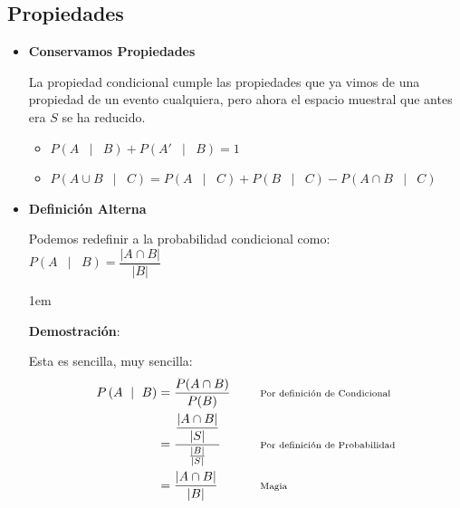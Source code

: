 \documentclass[12pt, fleqn]{report}                             %
\newenvironment{SmallIndentation}[1][0.75em]                    %
        {\begin{adjustwidth}{#1}{}\begin{footnotesize}}             %
        {\end{footnotesize}\end{adjustwidth}}                       %
\DeclareMathOperator \Space     {\quad}                         %
\DeclareMathOperator \MiniSpace {\;}                            %
\newcommand \Such           {\MiniSpace | \MiniSpace}           %
\newcommand \Remember[1]    {\Space\text{\scriptsize{#1}}}      %
\theoremstyle{break}                                            %
\newcommand{\Wrap}[1]           {\left( #1 \right)}             %
\newcommand{\Mag}[1]    {\left| #1 \right|}                     %
\begin{document}
            \clearpage
            \subsection{Propiedades}

                \begin{itemize}

                    \item
                        \textbf{Conservamos Propiedades}

                        La propiedad condicional cumple las propiedades que ya vimos de una propiedad
                        de un evento cualquiera, pero ahora el espacio muestral que antes era $S$ se
                        ha reducido.

                        \begin{itemize}
                            \item $P\Wrap{ A \Such B} + P\Wrap{ A' \Such B} = 1$
                            \item $P\Wrap{ A \cup B \Such C} 
                                        = P\Wrap{A \Such C} + P\Wrap{B \Such C}
                                        - P\Wrap{A \cap B \Such C}$
                        \end{itemize}


                    \item
                        \textbf{Definición Alterna}

                        Podemos redefinir a la probabilidad condicional como: 
                        $P \Wrap{ A \Such B} = \dfrac{\Mag{A \cap B}}{\Mag{B}}$

                        \begin{SmallIndentation}[1em]
                            \textbf{Demostración}:
                            
                            Esta es sencilla, muy sencilla:
                            \begin{align*}
                                P \Wrap{ A \Such B}
                                    &= \dfrac{P(A \cap B)}{P(B)}
                                        && \Remember{Por definición de Condicional}                 \\
                                    &= \frac{\dfrac{|A \cap B|}{|S|}}{\frac{|B|}{|S|}}
                                        && \Remember{Por definición de Probabilidad}                \\
                                    &= \dfrac{\Mag{A \cap B}}{\Mag{B}}
                                        && \Remember{Magia}
                            \end{align*}
                        

\end{SmallIndentation}
\end{itemize}
\end{document}
